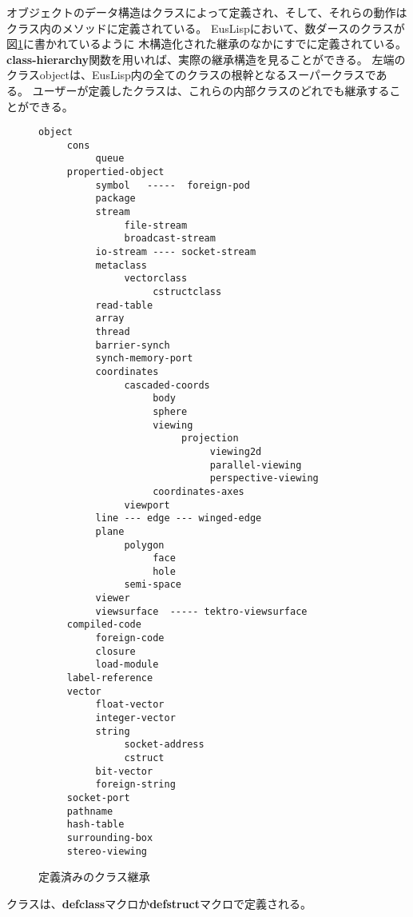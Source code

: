 オブジェクトのデータ構造はクラスによって定義され、そして、それらの動作は
クラス内のメソッドに定義されている。
EusLispにおいて、数ダースのクラスが図\ref{ClassHierarchy}に書かれているように
木構造化された継承のなかにすでに定義されている。
{\bf class-hierarchy}関数を用いれば、実際の継承構造を見ることができる。
左端のクラスobjectは、EusLisp内の全てのクラスの根幹となるスーパークラスである。
ユーザーが定義したクラスは、これらの内部クラスのどれでも継承することができる。

\begin{figure}
\small
\begin{verbatim}
object
     cons
          queue
     propertied-object
          symbol   -----  foreign-pod
          package
          stream
               file-stream
               broadcast-stream
          io-stream ---- socket-stream
          metaclass
               vectorclass
                    cstructclass
          read-table
          array
          thread
          barrier-synch
          synch-memory-port
          coordinates
               cascaded-coords
                    body
                    sphere
                    viewing
                         projection
                              viewing2d
                              parallel-viewing
                              perspective-viewing
                    coordinates-axes
               viewport
          line --- edge --- winged-edge
          plane
               polygon
                    face
                    hole
               semi-space
          viewer
          viewsurface  ----- tektro-viewsurface
     compiled-code
          foreign-code
          closure
          load-module
     label-reference
     vector
          float-vector
          integer-vector
          string
               socket-address
               cstruct
          bit-vector
          foreign-string
     socket-port
     pathname
     hash-table
     surrounding-box
     stereo-viewing
\end{verbatim}
\normalsize
\caption{\label{ClassHierarchy}定義済みのクラス継承}
\end{figure}

クラスは、{\bf defclass}マクロか{\bf defstruct}マクロで定義される。


